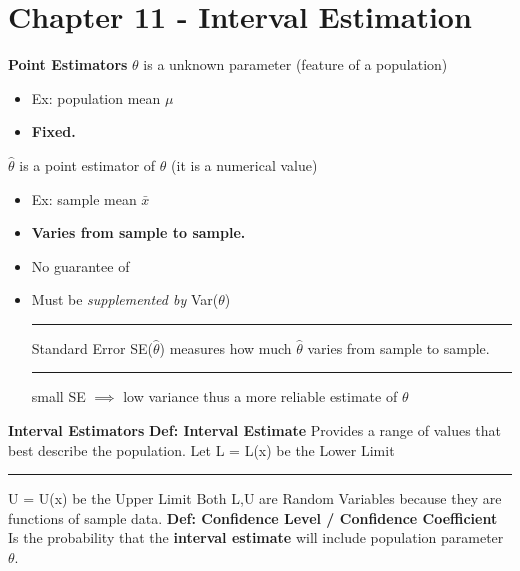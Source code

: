 \documentclass[]{article}
\begin{document}
\maketitle

\newpage
\Huge\section{Chapter 11 - Interval Estimation}
\Large\textbf{Point Estimators}
\newline $\theta$ is a unknown parameter (feature of a population)
\begin{itemize}
	\item Ex: population mean $\mu$
	\item \textbf{Fixed.} \newline
\end{itemize}
$\hat\theta$ is a point estimator of $\theta$ (it is a numerical value) 
\begin{itemize}
	\item Ex: sample mean $\bar{x}$
	\item \textbf{Varies from sample to sample.}
	\item No guarantee of 
	\item Must be \textit{supplemented by} Var($\theta$)
	\newline\Large\rule{1.3cm}{0pt} Standard Error SE($\hat\theta$) measures how much $\hat\theta$ varies from sample to sample.
	\newline\Large\rule{1.3cm}{0pt} small SE $\implies$ low variance thus a more reliable estimate of $\theta$ \newline
\end{itemize}
\Large\textbf{Interval Estimators} 
\newline
\newline\Large\textbf{Def: Interval Estimate}
\newline Provides a range of values that best describe the population.
\newline Let L = L(x) be the Lower Limit
\newline\Large\rule{0.68cm}{0pt} U = U(x) be the Upper Limit
\newline Both L,U are Random Variables because they are functions of sample data.
\newline
\newline\Large\textbf{Def: Confidence Level / Confidence Coefficient}
\newline Is the probability that the \textbf{interval estimate} will include population parameter $\theta$.
\end{document}
